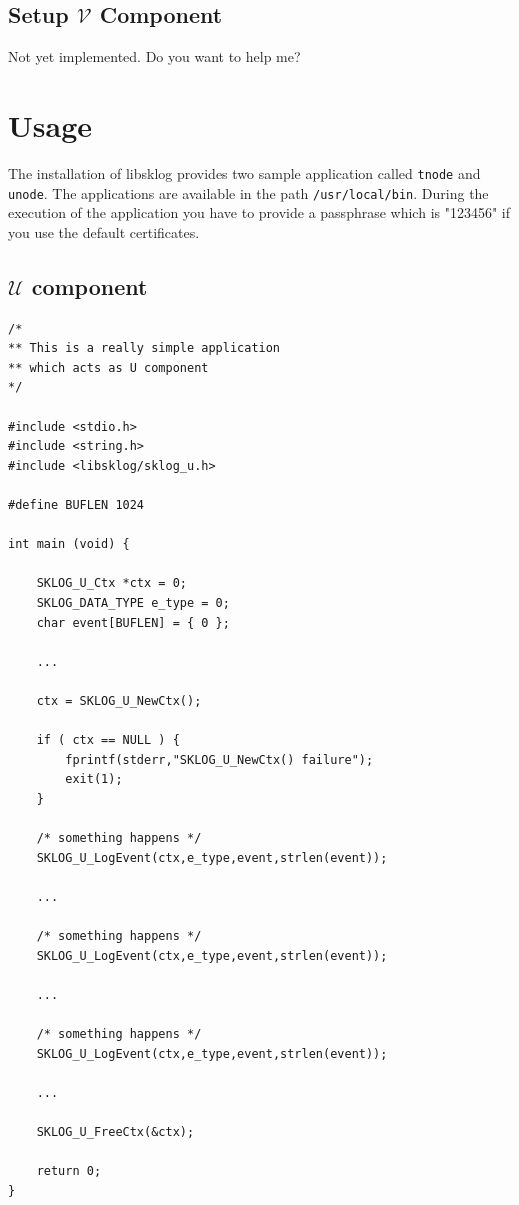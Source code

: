 \documentclass[a4paper,12pt]{article}
\def\u{$\mathcal{U}$\xspace}
\begin{document}

\subsection{Setup $\mathcal{V}$ Component}

Not yet implemented. Do you want to help me?

\newpage
\section{Usage}

The installation of libsklog provides two sample application called
\texttt{tnode} and \texttt{unode}. The applications are available
in the path \texttt{/usr/local/bin}. During the execution of the
application you have to provide a passphrase which is
"123456" if you use the default certificates.

\subsection{\u component}

\begin{lstlisting}
/*
** This is a really simple application
** which acts as U component
*/

#include <stdio.h>
#include <string.h>
#include <libsklog/sklog_u.h>

#define BUFLEN 1024

int main (void) {

    SKLOG_U_Ctx *ctx = 0;
    SKLOG_DATA_TYPE e_type = 0;
    char event[BUFLEN] = { 0 };

    ...

    ctx = SKLOG_U_NewCtx();

    if ( ctx == NULL ) {
        fprintf(stderr,"SKLOG_U_NewCtx() failure");
        exit(1);
    }

    /* something happens */
    SKLOG_U_LogEvent(ctx,e_type,event,strlen(event));

    ...

    /* something happens */
    SKLOG_U_LogEvent(ctx,e_type,event,strlen(event));

    ...

    /* something happens */
    SKLOG_U_LogEvent(ctx,e_type,event,strlen(event));

    ...

    SKLOG_U_FreeCtx(&ctx);

    return 0;
} 
\end{lstlisting}
\end{document}
